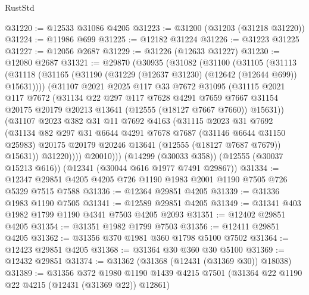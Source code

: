 \begin{lexlean}{RustStd}
\begin{coremodule}
@31220 := @12533 @31086 @4205
@31223 := @31200 (@31203 (@31218 @31220))
@31224 := @11986 @699
@31225 := @12182 @31224
@31226 := @31223 @31225
@31227 := @12056 @2687
@31229 := @31226 (@12633 @31227)
@31230 := @12080 @2687
@31321 := @29870
    (@30935
      (@31082
        (@31100
          (@31105
            (@31113
              (@31118 (@31165 (@31190 (@31229 (@12637 @31230) (@12642 (@12644 @699)) @15631))))
              (@31107
                @2021
                @2025
                @117
                @33
                @7672
                @31095
                (@31115
                  @2021
                  @117
                  @7672
                  (@31134
                    @22
                    @297
                    @117
                    @7628
                    @4291
                    @7659
                    @7667
                    @31154
                    @20175
                    @20179
                    @20213
                    @13641
                    (@12555 (@18127 @7667 @7660))
                    @15631))
                (@31107
                  @2023
                  @382
                  @31
                  @11
                  @7692
                  @4163
                  (@31115
                    @2023
                    @31
                    @7692
                    (@31134
                      @82
                      @297
                      @31
                      @6644
                      @4291
                      @7678
                      @7687
                      (@31146 @6644 @31150 @25983)
                      @20175
                      @20179
                      @20246
                      @13641
                      (@12555 (@18127 @7687 @7679))
                      @15631))
                  @31220))))
          @20010)))
    (@14299 (@30033 @358))
    (@12555 (@30037 @15213 @616))
    (@12341 (@30044 @616 @1977 @7491 @29867))
@31334 := @12347 @29851 @4205 @4205 @726 @1190 @1983 @2001 @1190 @7505 @726 @5329 @7515 @7588
@31336 := @12364 @29851 @4205
@31339 := @31336 @1983 @1190 @7505
@31341 := @12589 @29851 @4205
@31349 := @31341 @403 @1982 @1799 @1190 @4341 @7503 @4205 @2093
@31351 := @12402 @29851 @4205
@31354 := @31351 @1982 @1799 @7503
@31356 := @12411 @29851 @4205
@31362 := @31356 @370 @1981 @360 @1798 @5100 @7502
@31364 := @12423 @29851 @4205
@31368 := @31364 @30 @360 @30 @5100
@31369 := @12432 @29851
@31374 := @31362 (@31368 (@12431 (@31369 @30)) @18038)
@31389 := @31356
    @372
    @1980
    @1190
    @1439
    @4215
    @7501
    (@31364 @22 @1190 @22 @4215 (@12431 (@31369 @22)) @12861)

\end{coremodule}
\end{lexlean}
